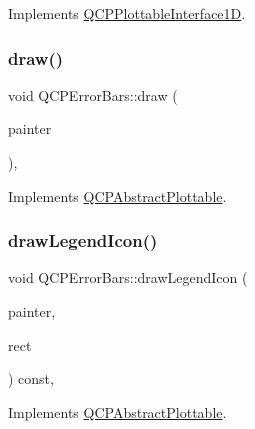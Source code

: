 Implements \mbox{\hyperlink{class_q_c_p_plottable_interface1_d_a9ca7fcf14d885a200879768679b19be9}{Q\+C\+P\+Plottable\+Interface1D}}.

\mbox{\label{class_q_c_p_error_bars_a801e85931372abf2a1034bfb2eac5cd2}} 
\subsubsection{\texorpdfstring{draw()}{draw()}}
{\footnotesize\ttfamily void Q\+C\+P\+Error\+Bars\+::draw (\begin{DoxyParamCaption}\item[{\mbox{\hyperlink{class_q_c_p_painter}{Q\+C\+P\+Painter}} $\ast$}]{painter }\end{DoxyParamCaption})\hspace{0.3cm}{\ttfamily [protected]}, {\ttfamily [virtual]}}



Implements \mbox{\hyperlink{class_q_c_p_abstract_plottable_a453f676a5cee7bf846c5f0fa05ea84b3}{Q\+C\+P\+Abstract\+Plottable}}.

\mbox{\label{class_q_c_p_error_bars_a20f5d292e66103f26bca00b11ce417b4}} 
\subsubsection{\texorpdfstring{drawLegendIcon()}{drawLegendIcon()}}
{\footnotesize\ttfamily void Q\+C\+P\+Error\+Bars\+::draw\+Legend\+Icon (\begin{DoxyParamCaption}\item[{\mbox{\hyperlink{class_q_c_p_painter}{Q\+C\+P\+Painter}} $\ast$}]{painter,  }\item[{const Q\+RectF \&}]{rect }\end{DoxyParamCaption}) const\hspace{0.3cm}{\ttfamily [protected]}, {\ttfamily [virtual]}}



Implements \mbox{\hyperlink{class_q_c_p_abstract_plottable_a9a450783fd9ed539e589999fd390cdf7}{Q\+C\+P\+Abstract\+Plottable}}.

\mbox{\label{class_q_c_p_error_bars_a5ad9abccb1be3df25485ad7dc21b3b89}} 
